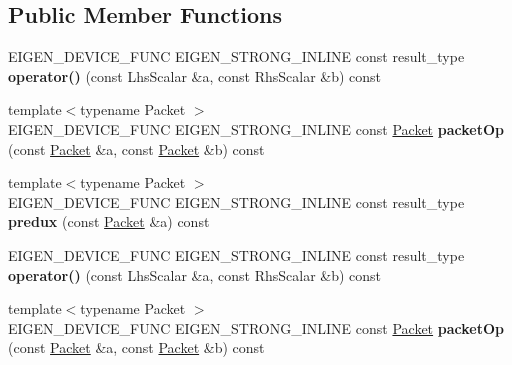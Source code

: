 \subsection*{Public Member Functions}
\begin{DoxyCompactItemize}
\item 
\mbox{\label{struct_eigen_1_1internal_1_1scalar__sum__op_a0692f46a25ed4792cba03d241604001f}} 
E\+I\+G\+E\+N\+\_\+\+D\+E\+V\+I\+C\+E\+\_\+\+F\+U\+NC E\+I\+G\+E\+N\+\_\+\+S\+T\+R\+O\+N\+G\+\_\+\+I\+N\+L\+I\+NE const result\+\_\+type {\bfseries operator()} (const Lhs\+Scalar \&a, const Rhs\+Scalar \&b) const
\item 
\mbox{\label{struct_eigen_1_1internal_1_1scalar__sum__op_ad1ce5f84741cd8f019b05ab556f87488}} 
{\footnotesize template$<$typename Packet $>$ }\\E\+I\+G\+E\+N\+\_\+\+D\+E\+V\+I\+C\+E\+\_\+\+F\+U\+NC E\+I\+G\+E\+N\+\_\+\+S\+T\+R\+O\+N\+G\+\_\+\+I\+N\+L\+I\+NE const \hyperlink{union_eigen_1_1internal_1_1_packet}{Packet} {\bfseries packet\+Op} (const \hyperlink{union_eigen_1_1internal_1_1_packet}{Packet} \&a, const \hyperlink{union_eigen_1_1internal_1_1_packet}{Packet} \&b) const
\item 
\mbox{\label{struct_eigen_1_1internal_1_1scalar__sum__op_a5aa5590c6f4545b2486f8de96fc6dc9c}} 
{\footnotesize template$<$typename Packet $>$ }\\E\+I\+G\+E\+N\+\_\+\+D\+E\+V\+I\+C\+E\+\_\+\+F\+U\+NC E\+I\+G\+E\+N\+\_\+\+S\+T\+R\+O\+N\+G\+\_\+\+I\+N\+L\+I\+NE const result\+\_\+type {\bfseries predux} (const \hyperlink{union_eigen_1_1internal_1_1_packet}{Packet} \&a) const
\item 
\mbox{\label{struct_eigen_1_1internal_1_1scalar__sum__op_a0692f46a25ed4792cba03d241604001f}} 
E\+I\+G\+E\+N\+\_\+\+D\+E\+V\+I\+C\+E\+\_\+\+F\+U\+NC E\+I\+G\+E\+N\+\_\+\+S\+T\+R\+O\+N\+G\+\_\+\+I\+N\+L\+I\+NE const result\+\_\+type {\bfseries operator()} (const Lhs\+Scalar \&a, const Rhs\+Scalar \&b) const
\item 
\mbox{\label{struct_eigen_1_1internal_1_1scalar__sum__op_ad1ce5f84741cd8f019b05ab556f87488}} 
{\footnotesize template$<$typename Packet $>$ }\\E\+I\+G\+E\+N\+\_\+\+D\+E\+V\+I\+C\+E\+\_\+\+F\+U\+NC E\+I\+G\+E\+N\+\_\+\+S\+T\+R\+O\+N\+G\+\_\+\+I\+N\+L\+I\+NE const \hyperlink{union_eigen_1_1internal_1_1_packet}{Packet} {\bfseries packet\+Op} (const \hyperlink{union_eigen_1_1internal_1_1_packet}{Packet} \&a, const \hyperlink{union_eigen_1_1internal_1_1_packet}{Packet} \&b) const

\end{DoxyCompactItemize}
